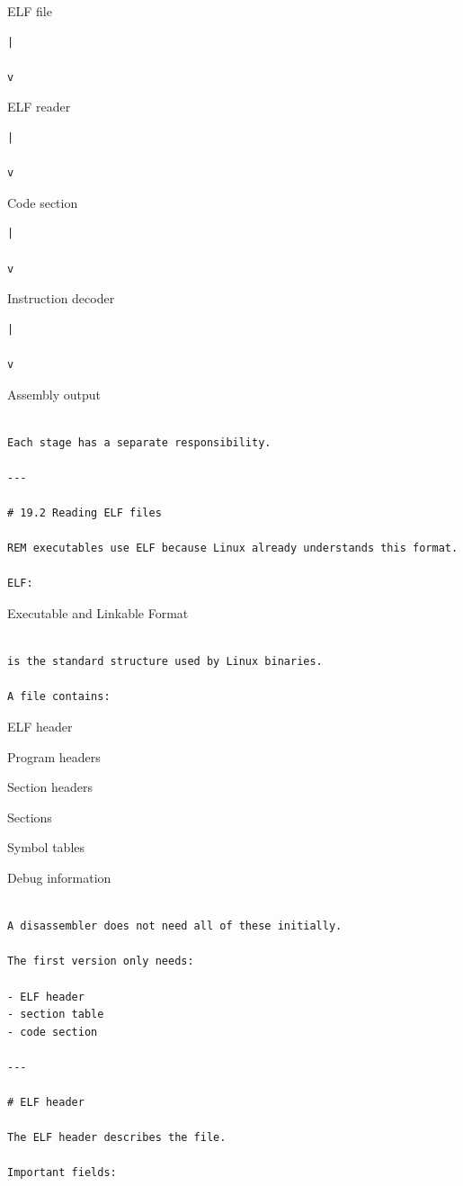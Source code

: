 \documentclass[
  oneside,
  openany]{book}
\begin{document}
ELF file

\begin{verbatim}
|

v
\end{verbatim}

ELF reader

\begin{verbatim}
|

v
\end{verbatim}

Code section

\begin{verbatim}
|

v
\end{verbatim}

Instruction decoder

\begin{verbatim}
|

v
\end{verbatim}

Assembly output

\begin{verbatim}

Each stage has a separate responsibility.

---

# 19.2 Reading ELF files

REM executables use ELF because Linux already understands this format.

ELF:
\end{verbatim}

Executable and Linkable Format

\begin{verbatim}

is the standard structure used by Linux binaries.

A file contains:
\end{verbatim}

ELF header

Program headers

Section headers

Sections

Symbol tables

Debug information

\begin{verbatim}

A disassembler does not need all of these initially.

The first version only needs:

- ELF header
- section table
- code section

---

# ELF header

The ELF header describes the file.

Important fields:
\end{verbatim}
\end{document}
